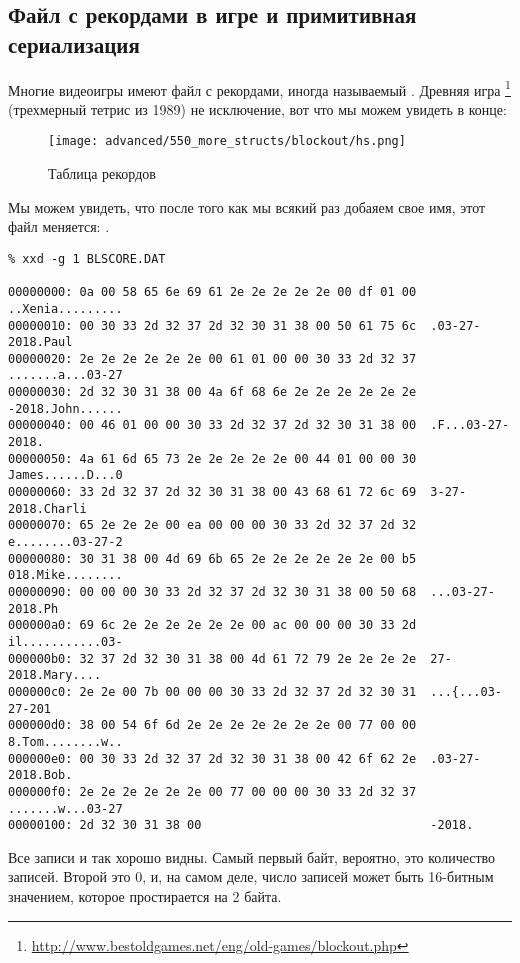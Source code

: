\subsection{Файл с рекордами в игре  и примитивная сериализация}

Многие видеоигры имеют файл с рекордами, иногда называемый .
Древняя игра \footnote{\url{http://www.bestoldgames.net/eng/old-games/blockout.php}}
(трехмерный тетрис из 1989) не исключение, вот что мы можем увидеть в конце:

\begin{figure}[H]
\centering
\texttt{[image: advanced/550\_more\_structs/blockout/hs.png]}
\caption{Таблица рекордов}
\end{figure}

Мы можем увидеть, что после того как мы всякий раз добаяем свое имя, этот файл меняется: .

\begin{lstlisting}
% xxd -g 1 BLSCORE.DAT

00000000: 0a 00 58 65 6e 69 61 2e 2e 2e 2e 2e 00 df 01 00  ..Xenia.........
00000010: 00 30 33 2d 32 37 2d 32 30 31 38 00 50 61 75 6c  .03-27-2018.Paul
00000020: 2e 2e 2e 2e 2e 2e 00 61 01 00 00 30 33 2d 32 37  .......a...03-27
00000030: 2d 32 30 31 38 00 4a 6f 68 6e 2e 2e 2e 2e 2e 2e  -2018.John......
00000040: 00 46 01 00 00 30 33 2d 32 37 2d 32 30 31 38 00  .F...03-27-2018.
00000050: 4a 61 6d 65 73 2e 2e 2e 2e 2e 00 44 01 00 00 30  James......D...0
00000060: 33 2d 32 37 2d 32 30 31 38 00 43 68 61 72 6c 69  3-27-2018.Charli
00000070: 65 2e 2e 2e 00 ea 00 00 00 30 33 2d 32 37 2d 32  e........03-27-2
00000080: 30 31 38 00 4d 69 6b 65 2e 2e 2e 2e 2e 2e 00 b5  018.Mike........
00000090: 00 00 00 30 33 2d 32 37 2d 32 30 31 38 00 50 68  ...03-27-2018.Ph
000000a0: 69 6c 2e 2e 2e 2e 2e 2e 00 ac 00 00 00 30 33 2d  il...........03-
000000b0: 32 37 2d 32 30 31 38 00 4d 61 72 79 2e 2e 2e 2e  27-2018.Mary....
000000c0: 2e 2e 00 7b 00 00 00 30 33 2d 32 37 2d 32 30 31  ...{...03-27-201
000000d0: 38 00 54 6f 6d 2e 2e 2e 2e 2e 2e 2e 00 77 00 00  8.Tom........w..
000000e0: 00 30 33 2d 32 37 2d 32 30 31 38 00 42 6f 62 2e  .03-27-2018.Bob.
000000f0: 2e 2e 2e 2e 2e 2e 00 77 00 00 00 30 33 2d 32 37  .......w...03-27
00000100: 2d 32 30 31 38 00                                -2018.
\end{lstlisting}

Все записи и так хорошо видны.
Самый первый байт, вероятно, это количество записей.
Второй это 0, и, на самом деле, число записей может быть 16-битным значением, которое простирается на 2 байта.


